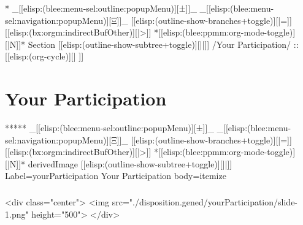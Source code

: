 \begin{whenOrg}
\begin{verblatex}
\begin{frame}[fragile,label=part_movingForward]
    \tableofcontents

\end{frame}
\end{verblatex}


\begin{whenOrg}
*  _[[elisp:(blee:menu-sel:outline:popupMenu)][±]]_ _[[elisp:(blee:menu-sel:navigation:popupMenu)][Ξ]]_ [[elisp:(outline-show-branches+toggle)][|=]] [[elisp:(bx:orgm:indirectBufOther)][|>]] *[[elisp:(blee:ppmm:org-mode-toggle)][|N]]*  Section    [[elisp:(outline-show-subtree+toggle)][||]]   /Your Participation/ ::  [[elisp:(org-cycle)][| ]]
\end{whenOrg}

\section{Your Participation}

\begin{whenOrg}
*****  _[[elisp:(blee:menu-sel:outline:popupMenu)][±]]_ _[[elisp:(blee:menu-sel:navigation:popupMenu)][Ξ]]_ [[elisp:(outline-show-branches+toggle)][|=]] [[elisp:(bx:orgm:indirectBufOther)][|>]] *[[elisp:(blee:ppmm:org-mode-toggle)][|N]]*  derivedImage [[elisp:(outline-show-subtree+toggle)][||]] Label=yourParticipation Your Participation body=itemize
\end{whenOrg}

\begin{htmlonly}

\begin{frame}[fragile,plain,label=yourParticipation]
    \frametitle{}
    \framesubtitle{}
    \begin{rawhtml}
<div class="center">
<img src="./disposition.gened/yourParticipation/slide-1.png" height="500">
</div>
    \end{rawhtml}
\end{frame}
\end{htmlonly}

\begin{verblatex}


\end{verblatex}
\end{whenOrg}

